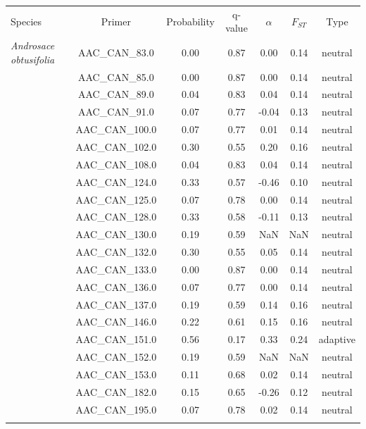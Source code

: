 \documentclass[11pt,]{article}
\begin{document}
\begin{longtable}[c]{@{}lcccccc@{}}
\toprule\addlinespace
Species & Primer & Probability & q-value & $\alpha$ & $F_{ST}$ & Type
\\\addlinespace
\midrule\endhead
\textit{Androsace obtusifolia} & AAC\_CAN\_83.0 & 0.00 & 0.87 & 0.00 &
0.14 & neutral
\\\addlinespace
& AAC\_CAN\_85.0 & 0.00 & 0.87 & 0.00 & 0.14 & neutral
\\\addlinespace
& AAC\_CAN\_89.0 & 0.04 & 0.83 & 0.04 & 0.14 & neutral
\\\addlinespace
& AAC\_CAN\_91.0 & 0.07 & 0.77 & -0.04 & 0.13 & neutral
\\\addlinespace
& AAC\_CAN\_100.0 & 0.07 & 0.77 & 0.01 & 0.14 & neutral
\\\addlinespace
& AAC\_CAN\_102.0 & 0.30 & 0.55 & 0.20 & 0.16 & neutral
\\\addlinespace
& AAC\_CAN\_108.0 & 0.04 & 0.83 & 0.04 & 0.14 & neutral
\\\addlinespace
& AAC\_CAN\_124.0 & 0.33 & 0.57 & -0.46 & 0.10 & neutral
\\\addlinespace
& AAC\_CAN\_125.0 & 0.07 & 0.78 & 0.00 & 0.14 & neutral
\\\addlinespace
& AAC\_CAN\_128.0 & 0.33 & 0.58 & -0.11 & 0.13 & neutral
\\\addlinespace
& AAC\_CAN\_130.0 & 0.19 & 0.59 & NaN & NaN & neutral
\\\addlinespace
& AAC\_CAN\_132.0 & 0.30 & 0.55 & 0.05 & 0.14 & neutral
\\\addlinespace
& AAC\_CAN\_133.0 & 0.00 & 0.87 & 0.00 & 0.14 & neutral
\\\addlinespace
& AAC\_CAN\_136.0 & 0.07 & 0.77 & 0.00 & 0.14 & neutral
\\\addlinespace
& AAC\_CAN\_137.0 & 0.19 & 0.59 & 0.14 & 0.16 & neutral
\\\addlinespace
& AAC\_CAN\_146.0 & 0.22 & 0.61 & 0.15 & 0.16 & neutral
\\\addlinespace
& AAC\_CAN\_151.0 & 0.56 & 0.17 & 0.33 & 0.24 & adaptive
\\\addlinespace
& AAC\_CAN\_152.0 & 0.19 & 0.59 & NaN & NaN & neutral
\\\addlinespace
& AAC\_CAN\_153.0 & 0.11 & 0.68 & 0.02 & 0.14 & neutral
\\\addlinespace
& AAC\_CAN\_182.0 & 0.15 & 0.65 & -0.26 & 0.12 & neutral
\\\addlinespace
& AAC\_CAN\_195.0 & 0.07 & 0.78 & 0.02 & 0.14 & neutral
\\\addlinespace

\end{longtable}
\end{document}
